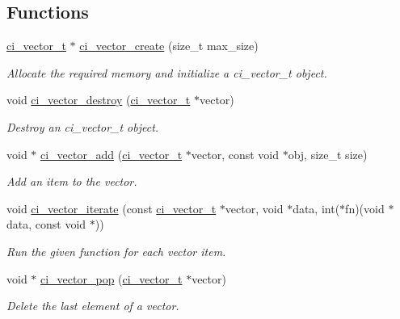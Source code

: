 \subsection*{Functions}
\begin{DoxyCompactItemize}
\item 
\hyperlink{group__VECTORS_ga911840034b768c5380eba22ad04d3c66}{ci\_\-vector\_\-t} $\ast$ \hyperlink{group__VECTORS_ga74dd5a2e00ded0702a2457437b12e37c}{ci\_\-vector\_\-create} (size\_\-t max\_\-size)
\begin{DoxyCompactList}\small\item\em Allocate the required memory and initialize a ci\_\-vector\_\-t object. \item\end{DoxyCompactList}\item 
void \hyperlink{group__VECTORS_gaaa97fdab2cf5e2503ccd490d438be3a6}{ci\_\-vector\_\-destroy} (\hyperlink{group__VECTORS_ga911840034b768c5380eba22ad04d3c66}{ci\_\-vector\_\-t} $\ast$vector)
\begin{DoxyCompactList}\small\item\em Destroy an ci\_\-vector\_\-t object. \item\end{DoxyCompactList}\item 
void $\ast$ \hyperlink{group__VECTORS_gaa4926d83176fa238117272065f30d7bc}{ci\_\-vector\_\-add} (\hyperlink{group__VECTORS_ga911840034b768c5380eba22ad04d3c66}{ci\_\-vector\_\-t} $\ast$vector, const void $\ast$obj, size\_\-t size)
\begin{DoxyCompactList}\small\item\em Add an item to the vector. \item\end{DoxyCompactList}\item 
void \hyperlink{group__VECTORS_gada645b52cd6479da84f52a53982b412d}{ci\_\-vector\_\-iterate} (const \hyperlink{group__VECTORS_ga911840034b768c5380eba22ad04d3c66}{ci\_\-vector\_\-t} $\ast$vector, void $\ast$data, int($\ast$fn)(void $\ast$data, const void $\ast$))
\begin{DoxyCompactList}\small\item\em Run the given function for each vector item. \item\end{DoxyCompactList}\item 
void $\ast$ \hyperlink{group__VECTORS_ga5c4c82776faa4553313427e18b504cb7}{ci\_\-vector\_\-pop} (\hyperlink{group__VECTORS_ga911840034b768c5380eba22ad04d3c66}{ci\_\-vector\_\-t} $\ast$vector)
\begin{DoxyCompactList}\small\item\em Delete the last element of a vector. \item\end{DoxyCompactList}\end{DoxyCompactItemize}


